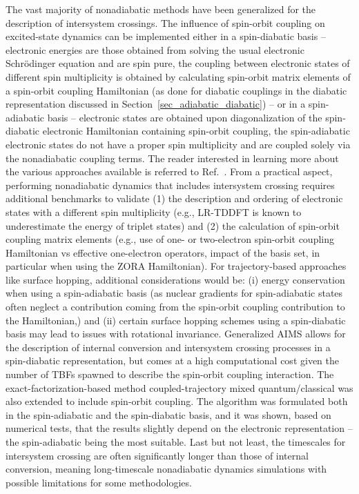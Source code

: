 \documentclass[9pt,bestpractices,pubversion]{livecoms}
\begin{document}
\begin{itemize}
{The vast majority of nonadiabatic methods have been generalized for the description of intersystem crossings. The influence of spin-orbit coupling on excited-state dynamics can be implemented either in a spin-diabatic basis -- electronic energies are those obtained from solving the usual electronic Schr\"{o}dinger equation and are spin pure, the coupling between electronic states of different spin multiplicity is obtained by calculating spin-orbit matrix elements of a spin-orbit coupling Hamiltonian (as done for diabatic couplings in the diabatic representation discussed in Section~\ref{sec_adiabatic_diabatic}) -- or in a spin-adiabatic basis -- electronic states are obtained upon diagonalization of the spin-diabatic electronic Hamiltonian containing spin-orbit coupling, the spin-adiabatic electronic states do not have a proper spin multiplicity and are coupled solely via the nonadiabatic coupling terms.\cite{michl,mai2015IJQC,granucci:22A501} The reader interested in learning more about the various approaches available is referred to Ref.~. From a practical aspect, performing nonadiabatic dynamics that includes intersystem crossing requires additional benchmarks to validate (1) the description and ordering of electronic states with a different spin multiplicity (e.g., LR-TDDFT is known to underestimate the energy of triplet states\cite{peach2011influence}) and (2) the calculation of spin-orbit coupling matrix elements (e.g., use of one- or two-electron spin-orbit coupling Hamiltonian vs effective one-electron operators, impact of the basis set, in particular when using the ZORA Hamiltonian). For trajectory-based approaches like surface hopping, additional considerations would be: (i) energy conservation when using a spin-adiabatic basis (as nuclear gradients for spin-adiabatic states often neglect a contribution coming from the spin-orbit coupling contribution to the Hamiltonian,\cite{mai2015IJQC}) and (ii) certain surface hopping schemes using a spin-diabatic basis may lead to issues with rotational invariance.\cite{granucci:22A501} 
Generalized AIMS allows for the description of internal conversion and intersystem crossing processes in a spin-diabatic representation, but comes at a high computational cost given the number of TBFs spawned to describe the spin-orbit coupling interaction.\cite{curchod2016communication,varganovGAIMS2021}
The exact-factorization-based method coupled-trajectory mixed quantum/classical was also extended to include spin-orbit coupling.\cite{talotta2020soc} The algorithm was formulated both in the spin-adiabatic and the spin-diabatic basis, and it was shown, based on numerical tests, that the results slightly depend on the electronic representation -- the spin-adiabatic being the most suitable. Last but not least, the timescales for intersystem crossing are often significantly longer than those of internal conversion, meaning long-timescale nonadiabatic dynamics simulations\cite{favero2013dynamics} with possible limitations for some methodologies.\cite{Mukherjeelongtime2025}}  


\end{itemize}
\end{document}
